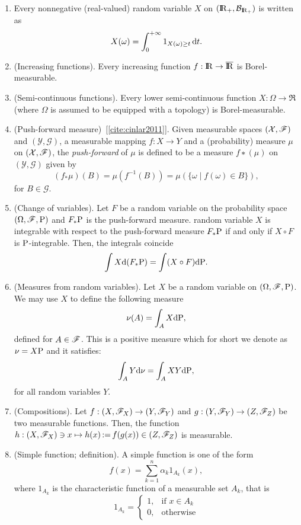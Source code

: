 \documentclass[a4paper,10pt]{article}
\begin{document}
\begin{enumerate}
 \item \label{rv221030}
      Every nonnegative (real-valued) random variable $X$ on $(\Re_+, \B_{{\Re}_+})$ 
      is written as 
      \[
        X(\omega) = \int_0^{+\infty} 1_{X(\omega)\geq t}\,\mathrm{d} t.
      \]

 \item (Increasing functions).  Every increasing function $f:\Re\to\barre$ is Borel-measurable.
 
 \item (Semi-continuous functions). Every lower semi-continuous function $X:\Omega\to\Re$ (where $\Omega$ is assumed 
       to be equipped with a topology) is Borel-measurable. 
       
 \item (Push-forward measure)~[\ref{cite:cinlar2011}]. Given measurable spaces $(\mathcal{X},\mathscr{F})$ and $(\mathcal{Y}, \mathcal{G})$, 
 a measurable mapping $f: X \to Y$ and a (probability) measure $\mu$ on $(\mathcal{X},\mathscr{F})$, the \textit{push-forward} of $\mu$
 is defined to be a measure $f∗(\mu)$ on $(\mathcal{Y}, \mathcal{G})$ given by
 \[
  (f_*\mu)(B) = \mu(f^{-1}(B)) = \mu(\{\omega\mid f(\omega)\in B\}),
 \]
 for $B\in\mathcal{G}$.
 \item (Change of variables). Let $F$ be a random variable on the probability space $(\Omega,\mathscr{F},\mathrm{P})$ and $F_*\mathrm{P}$ 
 is the push-forward measure. random variable $X$ is integrable with respect to the push-forward measure $F_*\mathrm{P}$
 if and only if $X\circ F$ is $\mathrm{P}$-integrable. Then, the integrals coincide
 \[
  \int X \mathrm{d}(F_*\mathrm{P}) = \int (X\circ F) \mathrm{d} \mathrm{P}.
 \]
 \item (Measures from random variables). Let $X$ be a random variable on $(\Omega,\mathscr{F},\mathrm{P})$. 
       We may use $X$ to define the following measure
       \[
        \nu(A) = \int_A X\mathrm{d} \mathrm{P},
       \]
       defined for $A\in\mathscr{F}$. This is a positive measure which for short we denote as $\nu=X\mathrm{P}$
       and it satisfies:
       \[
        \int_A Y\mathrm{d} \nu = \int_A XY\mathrm{d} \mathrm{P},
       \]
       for all random variables $Y$.
       
 \item (Compositions). Let $f:(X,\mathscr{F}_X)\to (Y, \mathscr{F}_Y)$ and $g:(Y,\mathscr{F}_Y)\to (Z,\mathscr{F}_Z)$ be two measurable functions. 
       Then, the function $h:(X,\mathscr{F}_X)\ni x\mapsto h(x) {}\mathop{\mathrel{:}=}{} f(g(x)) \in (Z,\mathscr{F}_Z)$ is measurable. 
       
 \item (Simple function; definition). A simple function is one of the form
	\[
	 f(x) = \sum_{k=1}^{n}\alpha_k 1_{A_k}(x),
	\]
	where $1_{A_k}$ is the characteristic function of a measurable set $A_k$, that is
	\[
	 1_{A_k} = \begin{cases}
	            1,&\text{if }x\in A_{k}\\
	            0,&\text{otherwise}
	           \end{cases}
	\]




\end{enumerate}
\end{document}

